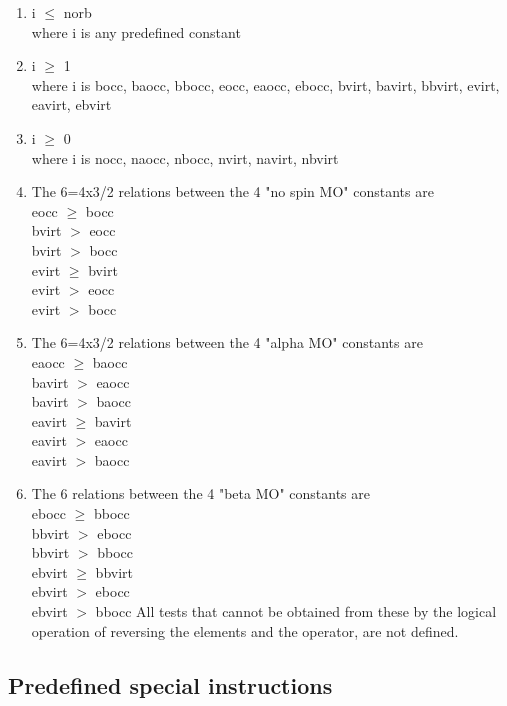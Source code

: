 \documentclass[12pt]{article}
\begin{document}
\begin{enumerate} 
\item i $\le$ norb \\ 
where i is any predefined constant \\ 
\item i $\ge$ 1 \\ 
where i is bocc, baocc, bbocc, eocc, eaocc, ebocc, bvirt, bavirt, bbvirt, evirt, 
eavirt, ebvirt \\ 
\item i $\ge$ 0 \\ 
where i is nocc, naocc, nbocc, nvirt, navirt, nbvirt
\item The 6=4x3/2 relations between the 4 "no spin MO" constants are \\ 
   eocc $\ge$ bocc \\
   bvirt $>$  eocc \\
   bvirt $>$  bocc \\
   evirt $\ge$ bvirt \\
   evirt $>$ eocc \\
   evirt $>$ bocc
\item The 6=4x3/2 relations between the 4 "alpha MO" constants are \\ 
   eaocc $\ge$ baocc \\
   bavirt $>$ eaocc \\
   bavirt $>$ baocc \\
   eavirt $\ge$ bavirt \\
   eavirt $>$ eaocc \\
   eavirt $>$ baocc \\
\item The 6 relations between the 4 "beta MO" constants are \\ 
   ebocc $\ge$ bbocc \\
   bbvirt $>$ ebocc \\
   bbvirt $>$ bbocc \\
   ebvirt $\ge$ bbvirt \\
   ebvirt $>$ ebocc \\
   ebvirt $>$ bbocc
All tests that cannot be obtained from these by the logical operation of reversing the 
elements and the operator, are not defined.
\end{enumerate} 



\subsection{Predefined special instructions}
\end{document}
